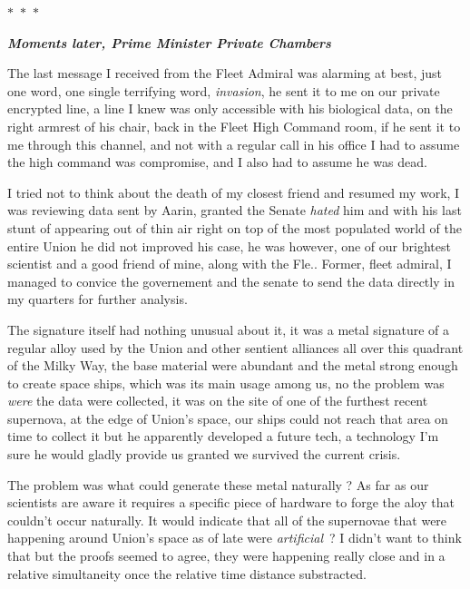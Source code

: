 \documentclass[colorlinks,12pt,a4paper]{book}
\newcommand\sep{\begin{center}
  \boldmath $\ast$~$\ast$~$\ast$
\end{center}}
\begin{document}
\sep 

\textit{\textbf{Moments later, Prime Minister Private Chambers}}\par
\bigskip

The last message I received from the Fleet Admiral was alarming at best, just one word, one single terrifying word, \textit{invasion},
he sent it to me on our private encrypted line, a line I knew was only accessible with his biological data,
on the right armrest of his chair, back in the Fleet High Command room, if he sent it to me through this channel, and not with 
a regular call in his office I had to assume the high command was compromise, and I also had to assume he was dead.\par 
\bigskip

I tried not to think about the death of my closest friend and resumed my work, I was reviewing data sent by Aarin, granted the Senate 
\textit{hated} him and with his last stunt of appearing out of thin air right on top of the most populated world of the entire Union he
did not improved his case, he was however, one of our brightest scientist and a good friend of mine, along with the Fle.. Former, fleet admiral,
I managed to convice the governement and the senate to send the data directly in my quarters for further analysis.\par 
\bigskip 

The signature itself had nothing unusual about it, it was a metal signature of a regular alloy used by the Union and other sentient alliances all 
over this quadrant of the Milky Way, the base material were abundant and the metal strong enough to create space ships, which was its main usage among
us, no the problem was \textit{were} the data were collected, it was on the site of one of the furthest recent supernova, at the edge 
of Union's space, our ships could not reach that area on time to collect it but he apparently developed a future tech, a technology I'm sure 
he would gladly provide us granted we survived the current crisis.\par 
\bigskip 

The problem was what could generate these metal naturally ? As far as our scientists are aware it requires a specific piece of hardware 
to forge the aloy that couldn't occur naturally. It would indicate that all of the supernovae that were happening around Union's space 
as of late were \textit{artificial} ? I didn't want to think that but the proofs seemed to agree, they were happening really close and
in a relative simultaneity once the relative time distance substracted.\par 
\bigskip 
\end{document}
